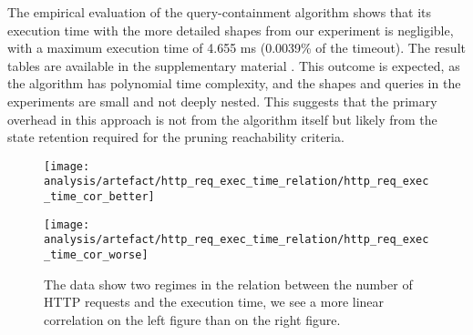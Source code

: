 The empirical evaluation of the query-containment algorithm shows that its execution time with the more detailed shapes from our experiment is negligible, with a maximum execution time of 4.655 ms (0.0039\% of the timeout).
The result tables are available in the supplementary material .
This outcome is expected, as the algorithm has polynomial time complexity, and the shapes and queries in the experiments are small and not deeply nested.
This suggests that the primary overhead in this approach is not from the algorithm itself but likely from the  state retention required for the pruning reachability criteria.

\begin{figure}[htbp]
    \centering
    \begin{minipage}[t]{0.40\linewidth}
        \centering
        \texttt{[image: analysis/artefact/http\_req\_exec\_time\_relation/http\_req\_exec\_time\_cor\_better]}
        \label{fig:http_req_exec_time_cor_better}
    \end{minipage}
    \hspace{0.05\textwidth}
    \begin{minipage}[t]{0.40\linewidth}
        \centering
        \texttt{[image: analysis/artefact/http\_req\_exec\_time\_relation/http\_req\_exec\_time\_cor\_worse]}
        \label{fig:http_req_exec_time_cor_worse}
    \end{minipage}

    \caption{
        The data show two regimes in the relation between the number of HTTP requests and the execution time, 
        we see a more linear correlation on the left figure than on the right figure.
        }
    \label{fig:http_req_exec_time_cor}
\end{figure}

